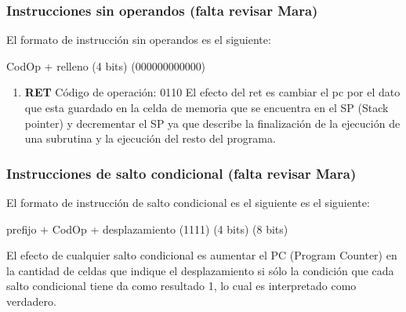 \subsubsection{Instrucciones sin operandos  (falta revisar Mara)}

El formato de instrucción sin operandos es el siguiente:

 CodOp     +    relleno 
(4 bits)     (000000000000)


\begin{enumerate}
\item \textbf{RET}
Código de operación: 0110
El efecto del ret es cambiar el pc por el dato que esta guardado en la celda de memoria que se encuentra en el SP (Stack pointer) y decrementar el SP ya que describe la finalización de la ejecución de una subrutina y la ejecución del resto del programa.
\end{enumerate}


\subsubsection{Instrucciones de salto condicional  (falta revisar Mara)}

El formato de instrucción de salto condicional es el siguiente es el siguiente:

 prefijo +   CodOp   +  desplazamiento 
 (1111)     (4 bits)     (8 bits)

El efecto de cualquier salto condicional es aumentar el PC (Program Counter) en la cantidad de celdas que indique el desplazamiento si sólo la condición que cada salto condicional tiene da como resultado 1, lo cual es interpretado como verdadero.

